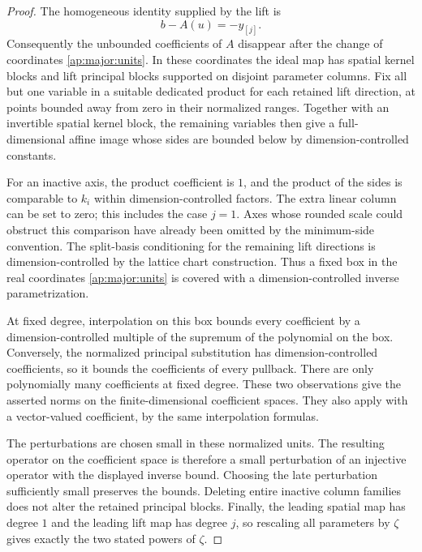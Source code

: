 \begin{proof}
The homogeneous identity supplied by the lift is
\[
                   b-A(u)=-y_{[j]}.
\]
Consequently the unbounded coefficients of $A$ disappear after the
change of coordinates \eqref{ap:major:units}.  In these coordinates
the ideal map has spatial kernel blocks and lift principal blocks
supported on disjoint parameter columns.  Fix all but one variable
in a suitable dedicated product for each retained lift direction,
at points bounded away from zero in their normalized ranges.  Together
with an invertible spatial kernel block, the remaining variables
then give a full-dimensional affine image whose sides are bounded
below by dimension-controlled constants.

For an inactive axis, the product coefficient is $1$, and the product
of the sides is comparable to $k_i$ within dimension-controlled
factors.  The extra linear column can be set to zero; this includes
the case $j=1$.  Axes whose rounded scale could obstruct this
comparison have already been omitted by the minimum-side convention.
The split-basis conditioning for the remaining lift directions is
dimension-controlled by the lattice chart construction.  Thus a fixed
box in the real coordinates \eqref{ap:major:units} is covered with a
dimension-controlled inverse parametrization.

At fixed degree, interpolation on this box bounds every coefficient
by a dimension-controlled multiple of the supremum of the polynomial
on the box.  Conversely, the normalized principal substitution has
dimension-controlled coefficients, so it bounds the coefficients of
every pullback.  There are only polynomially many coefficients at
fixed degree.  These two observations give the asserted norms on the
finite-dimensional coefficient spaces.  They also apply with a
vector-valued coefficient, by the same interpolation formulas.

The perturbations are chosen small in these normalized units.
The resulting operator on the coefficient space is therefore a small
perturbation of an injective operator with the displayed inverse
bound.  Choosing the late perturbation sufficiently small preserves
the bounds.  Deleting entire inactive column families does not alter
the retained principal blocks.  Finally, the leading spatial map has
degree $1$ and the leading lift map has degree $j$, so rescaling all
parameters by $\zeta$ gives exactly the two stated powers of $\zeta$.
\end{proof}

